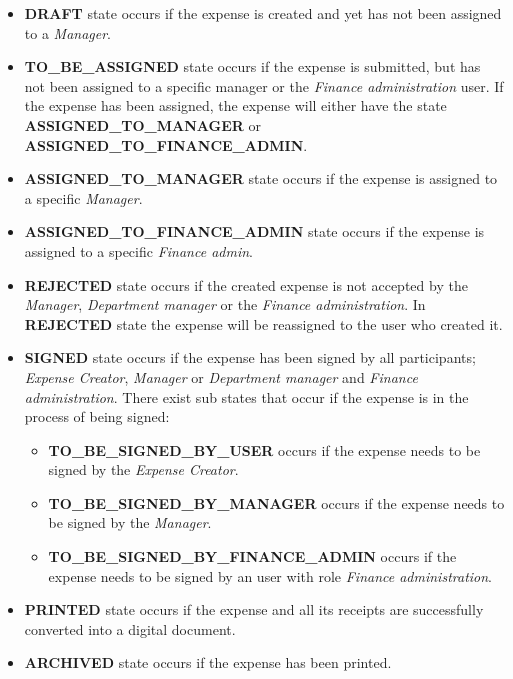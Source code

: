\begin{itemize}
	\item \textbf{DRAFT} state occurs if the expense is created and yet has not been assigned to a \textit{Manager}.
	
	\item \textbf{TO\_BE\_ASSIGNED} state occurs if the expense is submitted, but has not been assigned to a specific manager or the \textit{Finance administration} user. If the expense has been assigned, the expense will either have the state \newline \textbf{ASSIGNED\_TO\_MANAGER} or \newline \textbf{ASSIGNED\_TO\_FINANCE\_ADMIN}.
	
	\item \textbf{ASSIGNED\_TO\_MANAGER} state occurs if the expense is assigned to a specific \textit{Manager}.
	
	\item \textbf{ASSIGNED\_TO\_FINANCE\_ADMIN} state occurs if the expense is assigned to a specific \textit{Finance admin}.
	
	\item \textbf{REJECTED} state occurs if the created expense is not accepted by the \textit{Manager}, \textit{Department manager} or the \textit{Finance administration}. In \textbf{REJECTED} state the expense will be reassigned to the user who created it.
	
	\item \textbf{SIGNED} state occurs if the expense has been signed by all participants; \textit{Expense Creator}, \textit{Manager} or \textit{Department manager} and \textit{Finance administration}. There exist sub states that occur if the expense is in the process of being signed:
	\begin{itemize}
		\item \textbf{TO\_BE\_SIGNED\_BY\_USER} occurs if the expense needs to be signed by the \textit{Expense Creator}.
		\item \textbf{TO\_BE\_SIGNED\_BY\_MANAGER} occurs if the expense needs to be \newline signed by the \textit{Manager}.
		\item \textbf{TO\_BE\_SIGNED\_BY\_FINANCE\_ADMIN} occurs if the expense \newline needs to be signed by an user with role \textit{Finance administration}.
	\end{itemize}
	
	\item \textbf{PRINTED} state occurs if the expense and all its receipts are successfully converted into a digital document.
	
	\item \textbf{ARCHIVED} state occurs if the expense has been printed.
\end{itemize}

